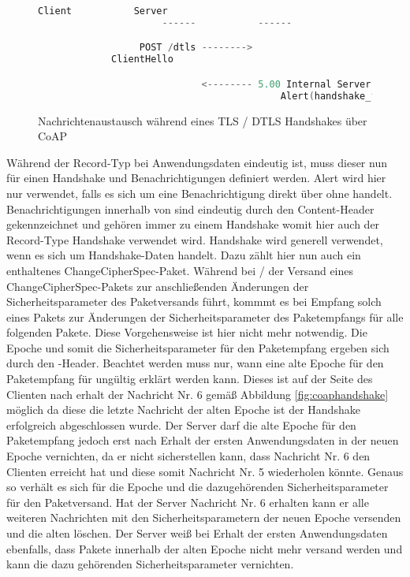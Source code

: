 {\begin{figure}[ht]
  \centering
  \begin{lstlisting}[language=c]
                      Client           Server
                      ------           ------

                  POST /dtls -------->
             ClientHello

                             <-------- 5.00 Internal Server Error
                                           Alert(handshake_failure)
  \end{lstlisting}
  \caption{Nachrichtenaustausch während eines TLS / DTLS Handshakes über CoAP}
  \label{fig:coaphandshakefail}
\end{figure}

Während der Record-Typ bei Anwendungsdaten eindeutig ist, muss dieser nun für einen Handshake und Benachrichtigungen definiert werden.
Alert wird hier nur verwendet, falls es sich um eine Benachrichtigung direkt über  ohne  handelt.
Benachrichtigungen innerhalb von  sind eindeutig durch den Content-Header gekennzeichnet und gehören immer zu einem Handshake
womit hier auch der Record-Type Handshake verwendet wird. Handshake wird generell verwendet, wenn es sich um Handshake-Daten handelt.
Dazu zählt hier nun auch ein enthaltenes ChangeCipherSpec-Paket. Während bei / der Versand eines ChangeCipherSpec-Pakets
zur anschließenden Änderungen der Sicherheitsparameter des Paketversands führt, kommmt es bei Empfang solch eines Pakets zur Änderungen der
Sicherheitsparameter des Paketempfangs für alle folgenden Pakete. Diese Vorgehensweise ist hier nicht mehr notwendig. Die Epoche und somit
die Sicherheitsparameter für den Paketempfang ergeben sich durch den -Header. Beachtet werden muss nur, wann eine alte Epoche
für den Paketempfang für ungültig erklärt werden kann. Dieses ist auf der Seite des Clienten nach erhalt der Nachricht Nr. 6 gemäß Abbildung
\ref{fig:coaphandshake} möglich da diese die letzte Nachricht der alten Epoche ist der Handshake erfolgreich abgeschlossen wurde.
Der Server darf die alte Epoche für den Paketempfang jedoch erst nach Erhalt der ersten Anwendungsdaten in der neuen Epoche vernichten, da
er nicht sicherstellen kann, dass Nachricht Nr. 6 den Clienten erreicht hat und diese somit Nachricht Nr. 5 wiederholen könnte.
Genaus so verhält es sich für die Epoche und die dazugehörenden Sicherheitsparameter für den Paketversand. Hat der Server Nachricht Nr. 6
erhalten kann er alle weiteren Nachrichten mit den Sicherheitsparametern der neuen Epoche versenden und die alten löschen. Der Server
weiß bei Erhalt der ersten Anwendungsdaten ebenfalls, dass Pakete innerhalb der alten Epoche nicht mehr versand werden und kann die
dazu gehörenden Sicherheitsparameter vernichten.

}
